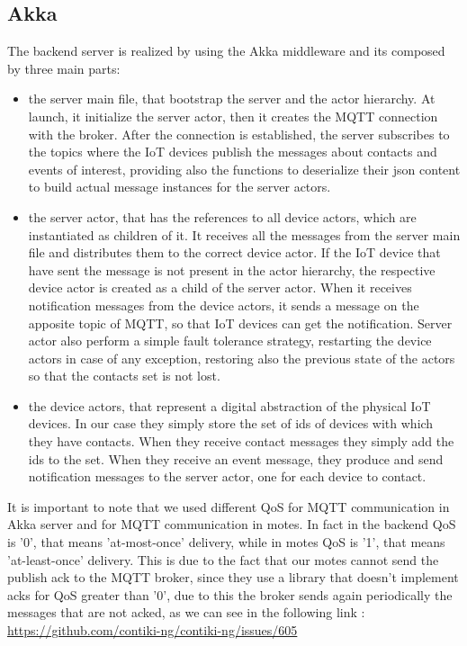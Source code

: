 \documentclass[10pt]{article}
\begin{document}
	\subsection{Akka}
	The backend server is realized by using the Akka middleware and its composed by three main parts:
	
	\begin{itemize}
		\item the server main file, that bootstrap the server and the actor hierarchy. At launch, it initialize the server actor, then it creates the MQTT connection with the broker. After the connection is established, the server subscribes to the topics where the IoT devices publish the messages about contacts and events of interest, providing also the functions to deserialize their json content to build actual message instances for the server actors.
		\item the server actor, that has the references to all device actors, which are instantiated as children of it. It receives all the messages from the server main file and distributes them to the correct device actor. If the IoT device that have sent the message is not present in the actor hierarchy, the respective device actor is created as a child of the server actor. When it receives notification messages from the device actors, it sends a message on the apposite topic of MQTT, so that IoT devices can get the notification. Server actor also perform a simple fault tolerance strategy, restarting the device actors in case of any exception, restoring also the previous state of the actors so that the contacts set is not lost.
		\item the device actors, that represent a digital abstraction of the physical IoT devices. In our case they simply store the set of ids of devices with which they have contacts. When they receive contact messages they simply add the ids to the set. When they receive an event message, they produce and send notification messages to the server actor, one for each device to contact.
	\end{itemize}      
	
	It is important to note that we used different QoS for MQTT communication in Akka server and for MQTT communication in motes. In fact in the backend QoS is '0', that means 'at-most-once' delivery, while in motes QoS is '1', that means 'at-least-once' delivery. This is due to the fact that our motes cannot send the publish ack to the MQTT broker, since they use a library that doesn't implement acks for QoS greater than '0', due to this the broker sends again periodically the messages that are not acked, as we can see in the following link : \url{https://github.com/contiki-ng/contiki-ng/issues/605}    
	
	
\end{document}
